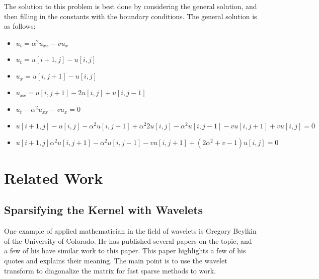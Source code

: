 
The solution to this problem is best done by considering the general solution, and then filling in the constants with the boundary conditions.  The general solution is as follows:

\begin{itemize}
\item $u_t = \alpha ^2 u_{xx} - vu_x $
\item $u_t  =  u[i+1,j] - u [i,j]$
\item $u_x = u[i,j+1] - u[i,j] $
\item $u_{xx} = u[i,j+1] - 2u[i,j] + u[i,j-1] $
\item $u_t - \alpha ^2 u_{xx} - vu_x = 0$
\item $ u[i+1,j] - u [i,j] -  \alpha ^2 u[i,j+1] + \alpha ^2 2u[i,j] - \alpha ^2 u[i,j-1] - v u[i,j+1] + v u[i,j] =0$
\item $ u[i+1,j]   \alpha ^2 u[i,j+1]  - \alpha ^2 u[i,j-1] - v u[i,j+1] + (2 \alpha ^2 +v - 1)  u[i,j] =0$ 
\end{itemize}


\section {Related Work}

\subsection {Sparsifying the Kernel with Wavelets}
One example of applied mathematician in the field of wavelets is Gregory Beylkin of the University of Colorado.  He has published several papers on the topic, and a few of his have similar work to this paper.  %
This paper highlights a few of his quotes and explains their meaning.  The main point is to use the wavelet transform to diagonalize the matrix for fast sparse methods to work.  

